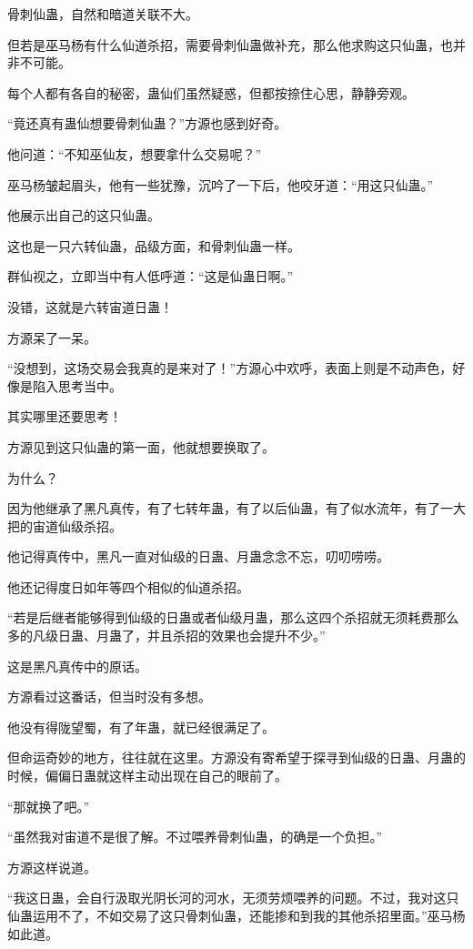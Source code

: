 \begin{this_body}
骨刺仙蛊，自然和暗道关联不大。

但若是巫马杨有什么仙道杀招，需要骨刺仙蛊做补充，那么他求购这只仙蛊，也并非不可能。

每个人都有各自的秘密，蛊仙们虽然疑惑，但都按捺住心思，静静旁观。

“竟还真有蛊仙想要骨刺仙蛊？”方源也感到好奇。

他问道：“不知巫仙友，想要拿什么交易呢？”

巫马杨皱起眉头，他有一些犹豫，沉吟了一下后，他咬牙道：“用这只仙蛊。”

他展示出自己的这只仙蛊。

这也是一只六转仙蛊，品级方面，和骨刺仙蛊一样。

群仙视之，立即当中有人低呼道：“这是仙蛊日啊。”

没错，这就是六转宙道日蛊！

方源呆了一呆。

“没想到，这场交易会我真的是来对了！”方源心中欢呼，表面上则是不动声色，好像是陷入思考当中。

其实哪里还要思考！

方源见到这只仙蛊的第一面，他就想要换取了。

为什么？

因为他继承了黑凡真传，有了七转年蛊，有了以后仙蛊，有了似水流年，有了一大把的宙道仙级杀招。

他记得真传中，黑凡一直对仙级的日蛊、月蛊念念不忘，叨叨唠唠。

他还记得度日如年等四个相似的仙道杀招。

“若是后继者能够得到仙级的日蛊或者仙级月蛊，那么这四个杀招就无须耗费那么多的凡级日蛊、月蛊了，并且杀招的效果也会提升不少。”

这是黑凡真传中的原话。

方源看过这番话，但当时没有多想。

他没有得陇望蜀，有了年蛊，就已经很满足了。

但命运奇妙的地方，往往就在这里。方源没有寄希望于探寻到仙级的日蛊、月蛊的时候，偏偏日蛊就这样主动出现在自己的眼前了。

“那就换了吧。”

“虽然我对宙道不是很了解。不过喂养骨刺仙蛊，的确是一个负担。”

方源这样说道。

“我这日蛊，会自行汲取光阴长河的河水，无须劳烦喂养的问题。不过，我对这只仙蛊运用不了，不如交易了这只骨刺仙蛊，还能掺和到我的其他杀招里面。”巫马杨如此道。


\end{this_body}
